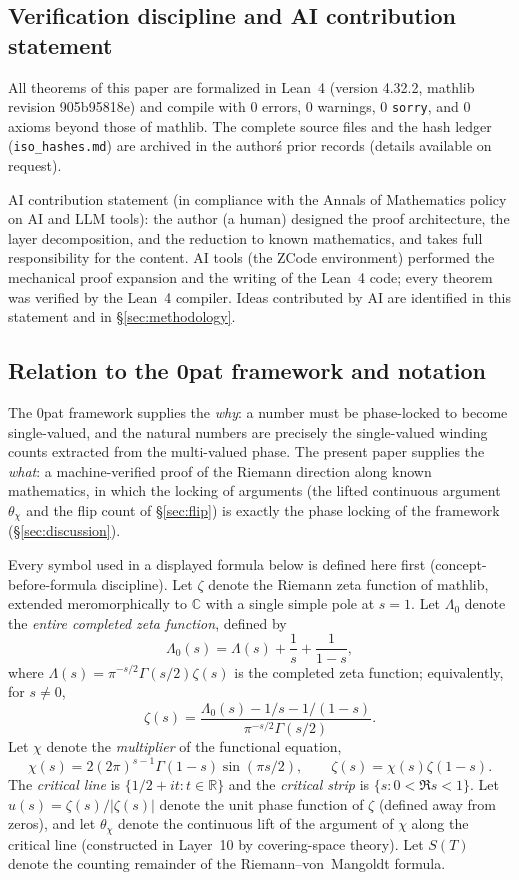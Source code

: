 \documentclass{article}
\newcommand{\C}{\mathbb{C}}
\newcommand{\R}{\mathbb{R}}
\newcommand{\GG}{\Gamma}
\newcommand{\zt}{\zeta}
\newcommand{\Lam}{\Lambda}
\newcommand{\Xchi}{\chi}
\begin{document}
\subsection{Verification discipline and AI contribution statement}
\label{sec:calibration}

All theorems of this paper are formalized in Lean~4 (version 4.32.2, mathlib
revision 905b95818e) and compile with $0$ errors, $0$ warnings, $0$
\texttt{sorry}, and $0$ axioms beyond those of mathlib. The complete source
files and the hash ledger (\texttt{iso\_hashes.md}) are archived in the author\'s prior records (details available on request).

AI contribution statement (in compliance with the Annals of Mathematics
policy on AI and LLM tools): the author (a human) designed the proof
architecture, the layer decomposition, and the reduction to known
mathematics, and takes full responsibility for the content. AI tools (the
ZCode environment) performed the mechanical proof expansion and the writing
of the Lean~4 code; every theorem was verified by the Lean~4 compiler. Ideas
contributed by AI are identified in this statement and in
\S\ref{sec:methodology}.

\subsection{Relation to the 0pat framework and notation}
\label{sec:relation}

The 0pat framework supplies the \emph{why}: a number must be phase-locked to
become single-valued, and the natural numbers are precisely the single-valued
winding counts extracted from the multi-valued phase. The present paper
supplies the \emph{what}: a machine-verified proof of the Riemann direction
along known mathematics, in which the locking of arguments (the lifted
continuous argument $\theta_\Xchi$ and the flip count of
\S\ref{sec:flip}) is exactly the phase locking of the framework
(\S\ref{sec:discussion}).

Every symbol used in a displayed formula below is defined here first
(concept-before-formula discipline). Let $\zt$ denote the Riemann zeta
function of mathlib, extended meromorphically to $\C$ with a single simple
pole at $s=1$. Let $\Lam_0$ denote the \emph{entire completed zeta
function}, defined by
\[
\Lam_0(s)=\Lam(s)+\frac{1}{s}+\frac{1}{1-s},
\]
where $\Lam(s)=\pi^{-s/2}\GG(s/2)\zt(s)$ is the completed zeta function;
equivalently, for $s\neq 0$,
\[
\zt(s)=\frac{\Lam_0(s)-1/s-1/(1-s)}{\pi^{-s/2}\GG(s/2)}.
\]
Let $\Xchi$ denote the \emph{multiplier} of the functional equation,
\[
\Xchi(s)=2(2\pi)^{s-1}\GG(1-s)\sin(\pi s/2),
\qquad
\zt(s)=\Xchi(s)\zt(1-s).
\]
The \emph{critical line} is $\{1/2+it:t\in\R\}$ and the \emph{critical
strip} is $\{s:0<\Re s<1\}$. Let $u(s)=\zt(s)/|\zt(s)|$ denote the unit
phase function of $\zt$ (defined away from zeros), and let $\theta_\Xchi$
denote the continuous lift of the argument of $\Xchi$ along the critical
line (constructed in Layer~10 by covering-space theory). Let
$S(T)$ denote the counting remainder of the Riemann--von~Mangoldt formula.
\end{document}
